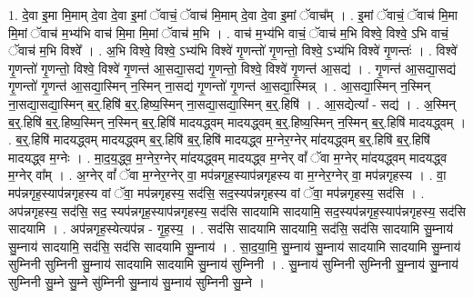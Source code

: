 \documentclass[17pt]{extarticle}
\begin{document}
1. दे॒वा इ॒मा मि॒माम् दे॒वा दे॒वा इ॒मां ॅवाचं॒ ॅवाच॑ मि॒माम् दे॒वा दे॒वा इ॒मां ॅवाच᳚म् । . इ॒मां ॅवाचं॒ ॅवाच॑ मि॒मा मि॒मां ॅवाच॑ म॒भ्य॑भि वाच॑ मि॒मा मि॒मां ॅवाच॑ म॒भि । . वाच॑ म॒भ्य॑भि वाचं॒ ॅवाच॑ म॒भि विश्वे॒ विश्वे॒ ऽभि वाचं॒ ॅवाच॑ म॒भि विश्वे᳚ । . अ॒भि विश्वे॒ विश्वे॒ ऽभ्य॑भि विश्वे॑ गृ॒णन्तो॑ गृ॒णन्तो॒ विश्वे॒ ऽभ्य॑भि विश्वे॑ गृ॒णन्तः॑ । . विश्वे॑ गृ॒णन्तो॑ गृ॒णन्तो॒ विश्वे॒ विश्वे॑ गृ॒णन्त॑ आ॒सद्या॒सद्य॑ गृ॒णन्तो॒ विश्वे॒ विश्वे॑ गृ॒णन्त॑ आ॒सद्य॑ । . गृ॒णन्त॑ आ॒सद्या॒सद्य॑ गृ॒णन्तो॑ गृ॒णन्त॑ आ॒सद्या॒स्मिन् न॒स्मिन् ना॒सद्य॑ गृ॒णन्तो॑ गृ॒णन्त॑ आ॒सद्या॒स्मिन्न् । . आ॒सद्या॒स्मिन् न॒स्मिन् ना॒सद्या॒सद्या॒स्मिन् ब॒र्॒.हिषि॑ ब॒र्॒.हिष्य॒स्मिन् ना॒सद्या॒सद्या॒स्मिन् ब॒र्॒.हिषि॑ । . आ॒सद्येत्या᳚ - सद्य॑ । . अ॒स्मिन् ब॒र्॒.हिषि॑ ब॒र्॒.हिष्य॒स्मिन् न॒स्मिन् ब॒र्॒.हिषि॑ मादयद्ध्वम् मादयद्ध्वम् ब॒र्॒.हिष्य॒स्मिन् न॒स्मिन् ब॒र्॒.हिषि॑ मादयद्ध्वम् । . ब॒र्॒.हिषि॑ मादयद्ध्वम् मादयद्ध्वम् ब॒र्॒.हिषि॑ ब॒र्॒.हिषि॑ मादयद्ध्व म॒ग्नेर॒ग्नेर् मा॑दयद्ध्वम् ब॒र्॒.हिषि॑ ब॒र्॒.हिषि॑ मादयद्ध्व म॒ग्नेः । . मा॒द॒य॒द्ध्व॒ म॒ग्नेर॒ग्नेर् मा॑दयद्ध्वम् मादयद्ध्व म॒ग्नेर् वां᳚ ॅवा म॒ग्नेर् मा॑दयद्ध्वम् मादयद्ध्व म॒ग्नेर् वा᳚म् । . अ॒ग्नेर् वां᳚ ॅवा म॒ग्नेर॒ग्नेर् वा॒ मप॑न्नगृह॒स्याप॑न्नगृहस्य वा म॒ग्नेर॒ग्नेर् वा॒ मप॑न्नगृहस्य । . वा॒ मप॑न्नगृह॒स्याप॑न्नगृहस्य वां ॅवा॒ मप॑न्नगृहस्य॒ सद॑सि॒ सद॒स्यप॑न्नगृहस्य वां ॅवा॒ मप॑न्नगृहस्य॒ सद॑सि । . अप॑न्नगृहस्य॒ सद॑सि॒ सद॒ स्यप॑न्नगृह॒स्याप॑न्नगृहस्य॒ सद॑सि सादयामि सादयामि॒ सद॒स्यप॑न्नगृह॒स्याप॑न्नगृहस्य॒ सद॑सि सादयामि । . अप॑न्नगृह॒स्येत्यप॑न्न - गृ॒ह॒स्य॒ । . सद॑सि सादयामि सादयामि॒ सद॑सि॒ सद॑सि सादयामि सु॒म्नाय॑ सु॒म्नाय॑ सादयामि॒ सद॑सि॒ सद॑सि सादयामि सु॒म्नाय॑ । . सा॒द॒या॒मि॒ सु॒म्नाय॑ सु॒म्नाय॑ सादयामि सादयामि सु॒म्नाय॑ सुम्निनी सुम्निनी सु॒म्नाय॑ सादयामि सादयामि सु॒म्नाय॑ सुम्निनी । . सु॒म्नाय॑ सुम्निनी सुम्निनी सु॒म्नाय॑ सु॒म्नाय॑ सुम्निनी सु॒म्ने सु॒म्ने सु॑म्निनी सु॒म्नाय॑ सु॒म्नाय॑ सुम्निनी सु॒म्ने । \newline
\end{document}
